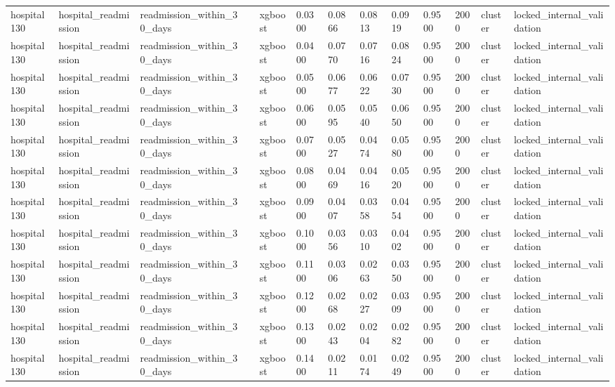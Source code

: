 \begin{tabular}{lllllllllllll}
hospital130 & hospital\_readmission & readmission\_within\_30\_days &  & xgboost & 0.0300 & 0.0866 & 0.0813 & 0.0919 & 0.9500 & 2000 & cluster & locked\_internal\_validation \\
hospital130 & hospital\_readmission & readmission\_within\_30\_days &  & xgboost & 0.0400 & 0.0770 & 0.0716 & 0.0824 & 0.9500 & 2000 & cluster & locked\_internal\_validation \\
hospital130 & hospital\_readmission & readmission\_within\_30\_days &  & xgboost & 0.0500 & 0.0677 & 0.0622 & 0.0730 & 0.9500 & 2000 & cluster & locked\_internal\_validation \\
hospital130 & hospital\_readmission & readmission\_within\_30\_days &  & xgboost & 0.0600 & 0.0595 & 0.0540 & 0.0650 & 0.9500 & 2000 & cluster & locked\_internal\_validation \\
hospital130 & hospital\_readmission & readmission\_within\_30\_days &  & xgboost & 0.0700 & 0.0527 & 0.0474 & 0.0580 & 0.9500 & 2000 & cluster & locked\_internal\_validation \\
hospital130 & hospital\_readmission & readmission\_within\_30\_days &  & xgboost & 0.0800 & 0.0469 & 0.0416 & 0.0520 & 0.9500 & 2000 & cluster & locked\_internal\_validation \\
hospital130 & hospital\_readmission & readmission\_within\_30\_days &  & xgboost & 0.0900 & 0.0407 & 0.0358 & 0.0454 & 0.9500 & 2000 & cluster & locked\_internal\_validation \\
hospital130 & hospital\_readmission & readmission\_within\_30\_days &  & xgboost & 0.1000 & 0.0356 & 0.0310 & 0.0402 & 0.9500 & 2000 & cluster & locked\_internal\_validation \\
hospital130 & hospital\_readmission & readmission\_within\_30\_days &  & xgboost & 0.1100 & 0.0306 & 0.0263 & 0.0350 & 0.9500 & 2000 & cluster & locked\_internal\_validation \\
hospital130 & hospital\_readmission & readmission\_within\_30\_days &  & xgboost & 0.1200 & 0.0268 & 0.0227 & 0.0309 & 0.9500 & 2000 & cluster & locked\_internal\_validation \\
hospital130 & hospital\_readmission & readmission\_within\_30\_days &  & xgboost & 0.1300 & 0.0243 & 0.0204 & 0.0282 & 0.9500 & 2000 & cluster & locked\_internal\_validation \\
hospital130 & hospital\_readmission & readmission\_within\_30\_days &  & xgboost & 0.1400 & 0.0211 & 0.0174 & 0.0249 & 0.9500 & 2000 & cluster & locked\_internal\_validation \\

\end{tabular}
